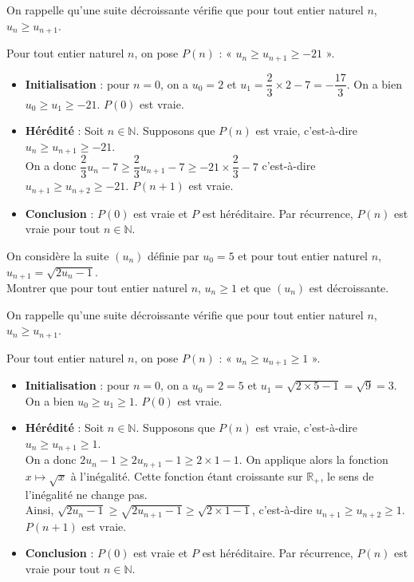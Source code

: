 \documentclass[11pt,fleqn]{book} %
\begin{document}
\begin{solution}
On rappelle qu'une suite décroissante vérifie que pour tout entier naturel $n$, $u_n \geqslant u_{n+1}$.

Pour tout entier naturel $n$, on pose $P(n)$ : « $u_n \geqslant u_{n+1} \geqslant -21$ ».

\begin{itemize}
\item \textbf{Initialisation} : pour $n=0$, on a $u_0=2$ et $u_1=\dfrac{2}{3}\times 2-7=-\dfrac{17}{3}$. On a bien  $u_0 \geqslant u_{1} \geqslant -21$. $P(0)$ est vraie.
\item \textbf{Hérédité} : Soit $n\in\mathbb{N}$. Supposons que $P(n)$ est vraie, c'est-à-dire $u_n \geqslant u_{n+1} \geqslant -21$.\\ On a donc $\dfrac{2}{3}u_n-7 \geqslant \dfrac{2}{3}u_{n+1}-7 \geqslant -21 \times \dfrac{2}{3} - 7$ c'est-à-dire $u_{n+1} \geqslant u_{n+2} \geqslant -21$. $P(n+1)$ est vraie.
\item \textbf{Conclusion} : $P(0)$ est vraie et $P$ est héréditaire. Par récurrence, $P(n)$ est vraie pour tout $n\in\mathbb{N}$.
\end{itemize}\end{solution}


\begin{exercise}
On considère la suite $(u_n)$ définie par $u_0=5$ et pour tout entier naturel $n$, $u_{n+1}=\sqrt{2u_n-1}$. \\Montrer que pour tout entier naturel $n$, $u_n \geqslant 1$ et que $(u_n)$ est décroissante.\end{exercise}


\begin{solution}
On rappelle qu'une suite décroissante vérifie que pour tout entier naturel $n$, $u_n \geqslant u_{n+1}$.

Pour tout entier naturel $n$, on pose $P(n)$ : « $u_n \geqslant u_{n+1} \geqslant 1$ ».

\begin{itemize}
\item \textbf{Initialisation} : pour $n=0$, on a $u_0=2=5$ et $u_1=\sqrt{2\times 5 -1}=\sqrt{9}=3$. On a bien  $u_0 \geqslant u_{1} \geqslant 1$. $P(0)$ est vraie.
\item \textbf{Hérédité} : Soit $n\in\mathbb{N}$. Supposons que $P(n)$ est vraie, c'est-à-dire $u_n \geqslant u_{n+1} \geqslant 1$.\\ On a donc $2u_n-1\geqslant 2u_{n+1}-1 \geqslant 2 \times 1 -1$. On applique alors la fonction $x\mapsto \sqrt{x}$ à l'inégalité. Cette fonction étant croissante sur $\mathbb{R}_+$, le sens de l'inégalité ne change pas. \\Ainsi, $\sqrt{2u_n-1} \geqslant \sqrt{2u_{n+1}-1} \geqslant \sqrt{2\times 1-1}$, c'est-à-dire $u_{n+1} \geqslant u_{n+2} \geqslant 1$.\\ $P(n+1)$ est vraie.
\item \textbf{Conclusion} : $P(0)$ est vraie et $P$ est héréditaire. Par récurrence, $P(n)$ est vraie pour tout $n\in\mathbb{N}$.
\end{itemize}\end{solution}
\end{document}
